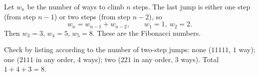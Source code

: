 Let $w_n$ be the number of ways to climb $n$ steps. The last jump is either one step (from step $n-1$) or two steps (from step $n-2$), so
\[w_n=w_{n-1}+w_{n-2},\qquad w_1=1,\ w_2=2 .\]
Then $w_3=3$, $w_4=5$, $w_5=\boxed{8}$. These are the Fibonacci numbers.

Check by listing according to the number of two-step jumps: none ($11111$, $1$ way); one ($2111$ in any order, $4$ ways); two ($221$ in any order, $3$ ways). Total $1+4+3=8$.
